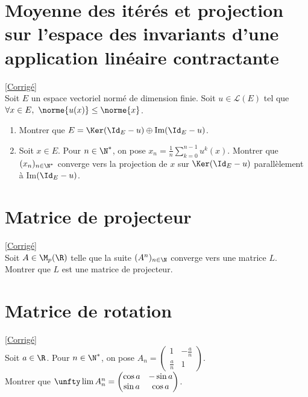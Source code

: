 \documentclass{book}
\begin{document}
	\section{Moyenne des itérés et projection sur l'espace des invariants d'une application linéaire contractante}
	\textcolor{blue}{\hyperref[sec:moyenne-des-iteres-et-projection-sur-lespace-des-invariants-dune-application-lineaire-contractante]{[Corrigé]}}\\
	\label{Moyenne des itérés et projection sur l'espace des invariants d'une application linéaire contractante}
	Soit $E$ un espace vectoriel normé de dimension finie. Soit $u\in \mathcal L(E)$ tel que $\forall x\in E,\ \norme{u(x)}\leq \norme{x}$.
	\begin{enumerate}
		\item Montrer que $E=\Ker(\Id_E-u)\oplus\text{Im}(\Id_E-u)$.
		\item Soit $x\in E$. Pour $n\in \N^*$, on pose $x_n=\displaystyle\frac{1}{n}\sum_{k=0}^{n-1}u^k(x)$. Montrer que $(x_n)_{n\in \N^*}$ converge vers la projection de $x$ sur $\Ker(\Id_E-u)$ parallèlement à Im$(\Id_E-u)$.
	\end{enumerate}
	
	\section{Matrice de projecteur}
	\textcolor{blue}{\hyperref[sec:matrice-de-projecteur]{[Corrigé]}}\\
	\label{Matrice de projecteur}
	Soit $A\in \M_p(\R)$ telle que la suite $(A^n)_{n\in \N}$ converge vers une matrice $L$. Montrer que $L$ est une matrice de projecteur.
	
	\section{Matrice de rotation}
	\textcolor{blue}{\hyperref[sec:matrice-de-rotation]{[Corrigé]}}\\
	\label{Matrice de rotation}
	Soit $a\in \R$. Pour $n\in \N^*$, on pose $A_n=
	\begin{pmatrix}
		1&\displaystyle-\frac{a}{n}\\
		\displaystyle\frac{a}{n}&1
	\end{pmatrix}$.\\
	Montrer que $\unfty\lim A_n^n=
	\begin{pmatrix}
		\cos a&-\sin a\\
		\sin a&\cos a
	\end{pmatrix}$.
	
\end{document}

